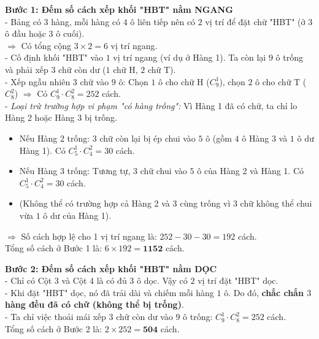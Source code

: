 \begin{ex}
{\begin{center}
		\end{center}
		\textbf{Bước 1: Đếm số cách xếp khối "HBT" nằm NGANG}
		\\ - Bảng có $3$ hàng, mỗi hàng có $4$ ô liên tiếp nên có $2$ vị trí để đặt chữ "HBT" (ở $3$ ô đầu hoặc $3$ ô cuối).
		\\ $\Rightarrow$ Có tổng cộng $3 \times 2 = 6$ vị trí ngang.
		\\ - Cố định khối "HBT" vào $1$ vị trí ngang (ví dụ ở Hàng 1). Ta còn lại $9$ ô trống và phải xếp $3$ chữ còn dư ($1$ chữ H, $2$ chữ T).
		\\ - Xếp ngẫu nhiên $3$ chữ vào $9$ ô: Chọn $1$ ô cho chữ H ($C_9^1$), chọn $2$ ô cho chữ T ($C_8^2$) $\Rightarrow$ Có $C_9^1 \cdot C_8^2 = 252$ cách.
		\\ - \textit{Loại trừ trường hợp vi phạm "có hàng trống":}
		Vì Hàng 1 đã có chữ, ta chỉ lo Hàng 2 hoặc Hàng 3 bị trống.
		\begin{itemize}
			\item Nếu Hàng 2 trống: $3$ chữ còn lại bị ép chui vào $5$ ô (gồm $4$ ô Hàng 3 và $1$ ô dư Hàng 1). Có $C_5^1 \cdot C_4^2 = 30$ cách.
			\item Nếu Hàng 3 trống: Tương tự, $3$ chữ chui vào $5$ ô của Hàng 2 và Hàng 1. Có $C_5^1 \cdot C_4^2 = 30$ cách.
			\item (Không thể có trường hợp cả Hàng 2 và 3 cùng trống vì $3$ chữ không thể chui vừa $1$ ô dư của Hàng 1).
		\end{itemize}
		$\Rightarrow$ Số cách hợp lệ cho 1 vị trí ngang là: $252 - 30 - 30 = 192$ cách.
		\\ Tổng số cách ở Bước 1 là: $6 \times 192 = \textbf{1152}$ cách.
		
		\textbf{Bước 2: Đếm số cách xếp khối "HBT" nằm DỌC}
		\\ - Chỉ có Cột 3 và Cột 4 là có đủ $3$ ô dọc. Vậy có $2$ vị trí đặt "HBT" dọc.
		\\ - Khi đặt "HBT" dọc, nó đã trải dài và chiếm mỗi hàng $1$ ô. Do đó, \textbf{chắc chắn $3$ hàng đều đã có chữ (không thể bị trống)}.
		\\ - Ta chỉ việc thoải mái xếp $3$ chữ còn dư vào $9$ ô trống: $C_9^1 \cdot C_8^2 = 252$ cách.
		\\ Tổng số cách ở Bước 2 là: $2 \times 252 = \textbf{504}$ cách.
		
}
\end{ex}
